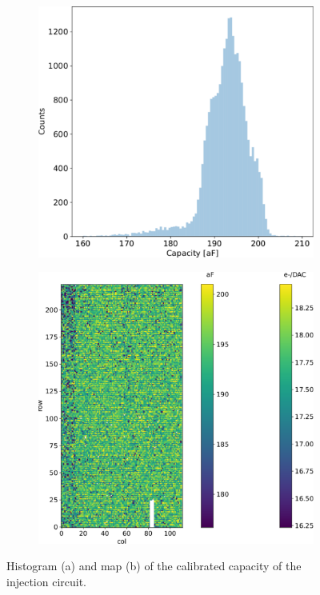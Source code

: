        \begin{figure}
        \centering
        \begin{subfigure}[b]{0.49\textwidth}
            \centering
            \includegraphics[width=\linewidth]{figures/charaterization/capacity.pdf}
            \caption{}
            \label{fig:}
        \end{subfigure}
        \hfill
        \begin{subfigure}[b]{0.49\textwidth}
            \centering
            \includegraphics[width=\linewidth]{figures/charaterization/conversion_factor_map.pdf}
            \caption{}
            \label{fig:}
        \end{subfigure}
        \caption{Histogram (a) and map (b) of the calibrated capacity of the injection circuit.}
        \label{fig:capacity_map}
        \end{figure} 

